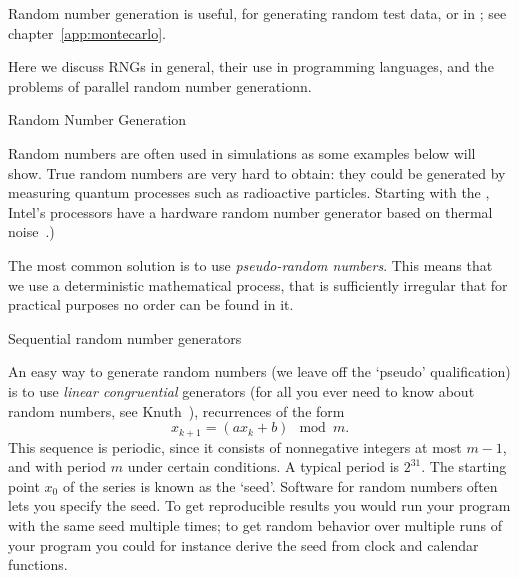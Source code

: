 
Random number generation is useful,
for generating random test data,
or in ;
see chapter~\ref{app:montecarlo}.

Here we discuss \acfp{RNG} in general,
their use in programming languages,
and the problems of parallel random number generationn.

 {Random Number Generation}

Random numbers are often used in simulations as some examples below
will show. True random numbers are very hard to obtain: they could be
generated by measuring quantum processes such as radioactive
particles. Starting with the ,
Intel's processors have a hardware random number generator based on
thermal noise~\cite{Cryptography:IvyRandom2012}.)

The most common solution is to use
\emph{pseudo-random numbers}. This means that we use a deterministic mathematical
process, that is sufficiently irregular that for practical purposes no
order can be found in it.

 {Sequential random number generators}

An easy way to generate random numbers (we leave off the `pseudo'
qualification) is to use
\emph{linear congruential}
 generators (for all you
ever need to know about random numbers, see Knuth~\cite{Knuth:vol2}),
recurrences of the form
\[ x_{k+1} = (ax_k+b) \mod m. \]
This sequence is periodic, since it consists of nonnegative integers at most
$m-1$, and with period $m$ under certain conditions. A
typical period is $2^{31}$. The starting point $x_0$ of the series is
known as the `seed'. Software for random numbers often lets you
specify the seed. To get reproducible results you would run your
program with the same seed multiple times; to get random behavior
over multiple runs of your program you could for instance derive the
seed from clock and calendar functions.

